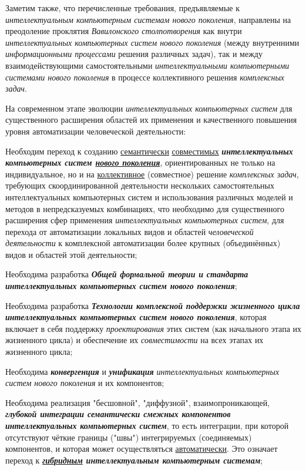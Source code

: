Заметим также, что перечисленные требования, предъявляемые к \textit{интеллектуальным компьютерным системам нового поколения}, направлены на преодоление проклятия \textit{Вавилонского столпотворения}\cite{Illiadis2019} как внутри \textit{интеллектуальных компьютерных систем нового поколения} (между внутренними \textit{информационными процессами} решения различных задач), так и между взаимодействующими самостоятельными \textit{интеллектуальными компьютерными системами нового поколения} в процессе коллективного решения \textit{комплексных задач}.

На современном этапе эволюции \textit{интеллектуальных компьютерных систем} для существенного расширения областей их применения и качественного повышения уровня автоматизации человеческой деятельности:
\begin{textitemize}
	\item
	Необходим переход к созданию \underline{семантически} \underline{совместимых} \textbf{\textit{интеллектуальных компьютерных систем \underline{нового поколения}}}, ориентированных не только на индивидуальное, но и на \underline{коллективное} (совместное) решение \textit{комплексных задач}, требующих скоординированной деятельности нескольких самостоятельных интеллектуальных компьютерных систем и использования различных моделей и методов в непредсказуемых комбинациях, что необходимо для существенного расширения сфер применения \textit{интеллектуальных компьютерных систем}, для перехода от автоматизации локальных видов и областей \textit{человеческой деятельности} к комплексной автоматизации более крупных (объединённых) видов и областей этой деятельности;
	\item
	Необходима разработка \textbf{\textit{Общей формальной теории и стандарта интеллектуальных компьютерных систем нового поколения}};
	\item
	Необходима разработка \textbf{\textit{Технологии комплексной поддержки жизненного цикла интеллектуальных компьютерных систем нового поколения}}, которая включает в себя поддержку \textit{проектирования} этих систем (как начального этапа их жизненного цикла) и обеспечение их \textit{совместимости} на всех этапах их жизненного цикла;
	\item
	Необходима \textbf{\textit{конвергенция}} и \textbf{\textit{унификация}} \textit{интеллектуальных компьютерных систем нового поколения} и их компонентов;
	\item
	Необходима реализация "бесшовной"{}, "диффузной"{}, взаимопроникающей, \textbf{\textit{глубокой интеграции семантически смежных компонентов интеллектуальных компьютерных систем}}, то есть интеграции, при которой отсутствуют чёткие границы ("швы") интегрируемых (соединяемых) компонентов, и которая может осуществляться \underline{автоматически}. Это означает переход к \textbf{\textit{\underline{гибридным} интеллектуальным компьютерным системам}};

\end{textitemize}
